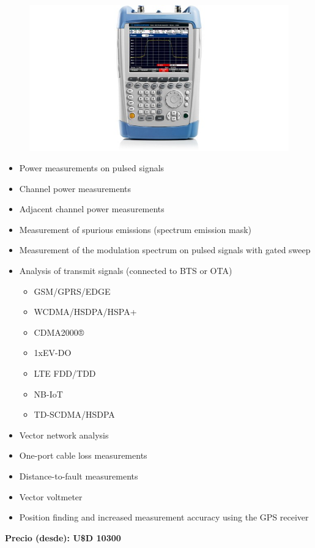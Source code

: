 \documentclass[a4paper,12pt]{report} %
\begin{document}
\begin{figure}[H]
	\centering
	\includegraphics[scale=0.6]{Imagenes/FSH}
\end{figure}

\begin{itemize}
	\item Power measurements on pulsed signals
	\item Channel power measurements
	\item Adjacent channel power measurements
	\item Measurement of spurious emissions (spectrum emission mask)
	\item Measurement of the modulation spectrum on pulsed signals with gated sweep
	\item Analysis of transmit signals (connected to BTS or OTA)
	\begin{itemize}
		\item GSM/GPRS/EDGE
		\item WCDMA/HSDPA/HSPA+
		\item CDMA2000®
		\item 1xEV-DO
		\item LTE FDD/TDD
		\item NB-IoT
		\item TD-SCDMA/HSDPA
	\end{itemize}
	\item Vector network analysis
	\item One-port cable loss measurements
	\item Distance-to-fault measurements
	\item Vector voltmeter
	\item Position finding and increased measurement accuracy using the GPS receiver
\end{itemize}

\large{\textbf{Precio (desde): U\$D 10300}}
\end{document}
